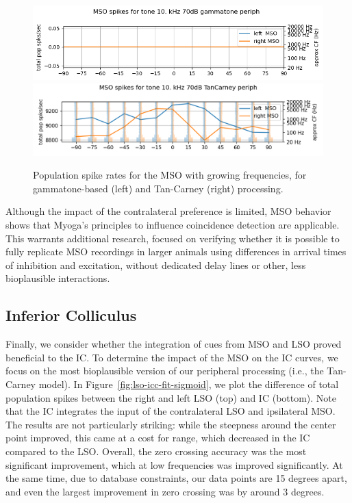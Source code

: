 \documentclass[11pt,a4paper,twocolumn]{article}
\begin{document}
\begin{figure}
    \includegraphics[width=0.4\linewidth]{Images/gamm10000.png}
    \includegraphics[width=0.4\linewidth]{Images/mtc10000.png}
    \caption{Population spike rates for the MSO with growing frequencies, for gammatone-based (left) and Tan-Carney (right) processing.}
    \label{fig:res-mso}
\end{figure}

Although the impact of the contralateral preference is limited, MSO behavior shows that Myoga's principles to influence coincidence detection are applicable. This warrants additional research, focused on verifying whether it is possible to fully replicate MSO recordings in larger animals using differences in arrival times of inhibition and excitation, without dedicated delay lines or other, less bioplausible interactions.

\subsection{Inferior Colliculus}
Finally, we consider whether the integration of cues from MSO and LSO proved beneficial to the IC. To determine the impact of the MSO on the IC curves, we focus on the most bioplausible version of our peripheral processing (i.e., the Tan-Carney model). In Figure~\ref{fig:lso-icc-fit-sigmoid}, we plot the difference of total population spikes between the right and left LSO (top) and IC (bottom). Note that the IC integrates the input of the contralateral LSO and ipsilateral MSO. The results are not particularly striking: while the steepness around the center point improved, this came at a cost for range, which decreased in the IC compared to the LSO. Overall, the zero crossing accuracy was the most significant improvement, which at low frequencies was improved significantly. At the same time, due to database constraints, our data points are 15 degrees apart, and even the largest improvement in zero crossing was by around 3 degrees.     
\end{document}
